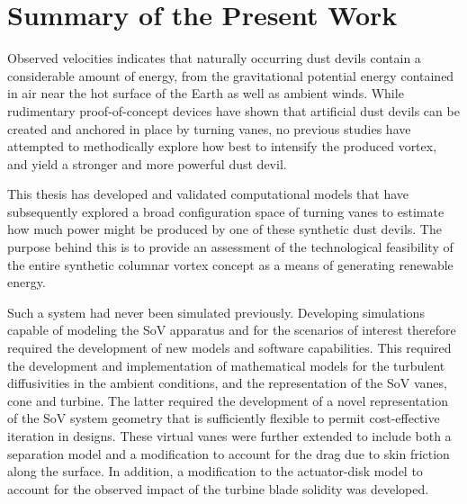 \label{sec:conclusions}

%
%

%
%

\section{Summary of the Present Work}

%
%

%
%
%

Observed velocities indicates that naturally occurring dust devils
contain a considerable amount of energy, from the gravitational
potential energy contained in air near the hot surface of the Earth 
as well as ambient winds. While rudimentary proof-of-concept devices have shown 
that artificial dust devils can be created and
anchored in place by turning vanes, no previous studies have attempted
to methodically explore how best to intensify the produced vortex,
and yield a stronger and more powerful dust devil. 

This thesis has developed and validated computational models that have
subsequently 
explored a broad configuration space of turning vanes to estimate
how much power might be produced by one of these synthetic dust devils.
The purpose behind this is to provide an assessment of the technological 
feasibility of the entire synthetic columnar vortex concept as a means 
of generating renewable energy. 

Such a system had never been simulated previously. Developing
simulations capable of modeling the SoV apparatus and for the scenarios
of interest therefore required the development of new models and
software capabilities. This required the development and implementation
of mathematical models for the turbulent diffusivities in the ambient
conditions, and the representation of the SoV vanes, cone and
turbine. The latter required the development of a novel representation
of the SoV system geometry that is sufficiently flexible to permit
cost-effective iteration in designs. These virtual vanes were
further extended to include both a separation model and a modification to account for 
the drag due to skin friction along the surface. 
In addition, a modification to the actuator-disk model to account 
for the observed impact of the turbine blade solidity was developed. 

